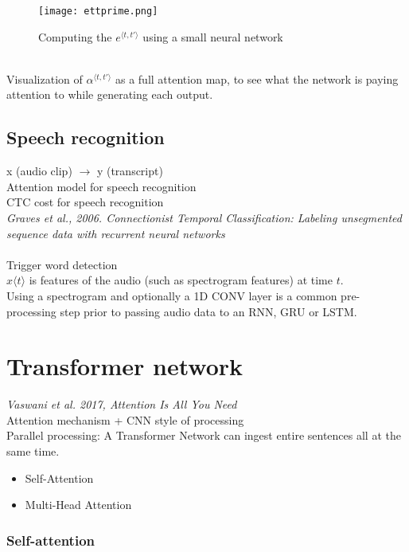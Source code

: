 \begin{figure}[h]
    \centering
    \texttt{[image: ettprime.png]}
    \caption{Computing the $e^{\langle t, t' \rangle}$ using a small neural network}
    \label{fig:ettprime}
\end{figure}
~\\
Visualization of $\alpha^{\langle t, t' \rangle}$ as a full attention map, to see what the network is paying attention to while generating each output.\\

%
\subsection{Speech recognition}
x (audio clip) $\longrightarrow$ y (transcript)\\
Attention model for speech recognition\\
CTC cost for speech recognition\\
\textit{Graves et al., 2006. Connectionist Temporal Classification: Labeling unsegmented sequence data with recurrent neural networks}\\
\\
Trigger word detection\\
$x{\langle t \rangle}$ is features of the audio (such as spectrogram features) at time $t$.\\
Using a spectrogram and optionally a 1D CONV layer is a common pre-processing step prior to passing audio data to an RNN, GRU or LSTM.


\section{Transformer network}
\textit{Vaswani et al. 2017, Attention Is All You Need}\\
Attention mechanism + CNN style of processing\\
Parallel processing: A Transformer Network can ingest entire sentences all at the same time.

\begin{itemize}
\item
Self-Attention
\item
Multi-Head Attention
\end{itemize}

\subsubsection{Self-attention}

